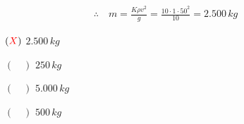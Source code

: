 \documentclass[a4paper, 12pt]{article}
\newcommand{\red}[1]{\textcolor{red}{#1}}
\begin{document}
\begin{flushleft}
\begin{itemize}
\begin{itemize}
{\begin{itemize}
\begin{equation*}
\begin{gathered}
                                    \therefore \quad m=\frac{K\rho v^2}{g}=\frac{10 \cdot 1 \cdot 50^2}{10}= 2.500 \, kg
                                \end{gathered} \end{equation*}
                        \end{itemize}}
                        \begin{itemize}
                            \item[$(\red{X})$] $2.500 \, kg$
                            \item[$(\quad)$] $250 \, kg$
                            \item[$(\quad)$] $5.000 \, kg$
                            \item[$(\quad)$] $500 \, kg$
                        \end{itemize}
                \end{itemize}


\end{itemize}
\end{flushleft}
\end{document}
